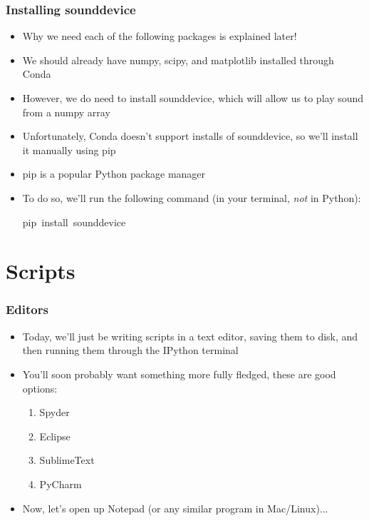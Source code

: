 \documentclass{beamer}\usepackage[]{graphicx}\usepackage[]{color}
\makeatletter
\newcommand{\hlstd}[1]{\textcolor[rgb]{0.345,0.345,0.345}{#1}}%
\newcommand{\hlkwc}[1]{\textcolor[rgb]{0.333,0.667,0.333}{#1}}%
\newenvironment{kframe}{%
 \def\at@end@of@kframe{}%
 \ifinner\ifhmode%
  \def\at@end@of@kframe{\end{minipage}}%
  \begin{minipage}{\columnwidth}%
 \fi\fi%
 \def\FrameCommand##1{\hskip\@totalleftmargin \hskip-\fboxsep
 \colorbox{shadecolor}{##1}\hskip-\fboxsep
     \hskip-\linewidth \hskip-\@totalleftmargin \hskip\columnwidth}%
 \MakeFramed {\advance\hsize-\width
   \@totalleftmargin\z@ \linewidth\hsize
   \@setminipage}}%
 {\par\unskip\endMakeFramed%
 \at@end@of@kframe}
\newenvironment{knitrout}{}{} %
\makeatother
\begin{document}
\begin{frame}[fragile]
\frametitle{Installing sounddevice}
	\begin{itemize}
		\item Why we need each of the following packages is explained later!

		\item We should already have numpy, scipy, and matplotlib installed through Conda

		\item However, we do need to install sounddevice, which will allow us to play sound from a numpy array

		\item Unfortunately, Conda doesn't support installs of sounddevice, so we'll install it manually using pip

		\item pip is a popular Python package manager

		\item To do so, we'll run the following command (in your terminal, \emph{not} in Python):

\begin{knitrout}
\color{fgcolor}\begin{kframe}
\noindent
\ttfamily
\hlstd{pip\ }\hlkwc{install\ }\hlstd{sounddevice}\hspace*{\fill}
\mbox{}
\normalfont
\end{kframe}
\end{knitrout}

	\end{itemize}
\end{frame}

\section{Scripts}

\begin{frame}
\frametitle{Editors}
\begin{itemize}
	\item Today, we'll just be writing scripts in a text editor, saving them to disk, and then running them through the IPython terminal 
	\item You'll soon probably want something more fully fledged, these are good options:
	\begin{enumerate}
		\item Spyder

		\item Eclipse

		\item SublimeText

		\item PyCharm
	\end{enumerate}

	\item Now, let's open up Notepad (or any similar program in Mac/Linux)... 
\end{itemize}
\end{frame}
\end{document}

